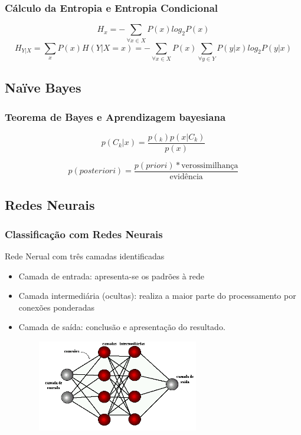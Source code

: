 \documentclass[11pt]{beamer}
\begin{document}
\begin{frame}\frametitle{ Cálculo da Entropia e Entropia Condicional}
	\transdissolve[duration=1, direction=25]
	\begin{equation}
	H_{x}=-\sum_{\forall x \in X}P(x)log_{2}P(x)
	\end{equation}
	\begin{equation}
	H_{Y|X}= \sum_{x}P(x)H(Y|X=x) =-\sum_{\forall x \in X}P(x) \sum_{\forall y \in Y}P(y|x)log_{2}P(y|x)
	\end{equation}
\end{frame}


\subsection{ Naïve Bayes}

\begin{frame}\frametitle{ Teorema de Bayes e Aprendizagem bayesiana}
	\transdissolve[duration=1, direction=25]
	\begin{equation}
	p(C_{k}|x) = \frac{p(_{k})p(x|C_{k})}{p(x)}
	\end{equation}
	
	\begin{equation}
	p(posteriori) = \frac{p(priori) * {\text{verossimilhança}}}{\text{evidência}}
	\end{equation}
\end{frame}

\subsection{ Redes Neurais}

\begin{frame}\frametitle{ Classificação com Redes Neurais}
	\transdissolve[duration=1, direction=25]
	Rede Nerual com três camadas identificadas
	\begin{itemize}
		\item Camada de entrada: apresenta-se os padrões à rede
		\item Camada intermediária (ocultas): realiza a maior parte do processamento por conexões ponderadas
		\item Camada de saída: conclusão e apresentação do resultado.
	\end{itemize}
	\begin{figure}[!ht]
		\includegraphics[width=80mm, height=40mm]{Figuras/BigData/camdasIntermediarias.png}
	\end{figure}
\end{frame}
\end{document}
